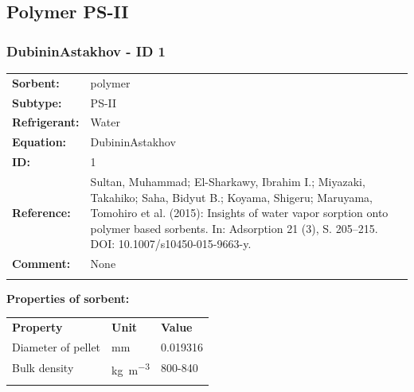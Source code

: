 \subsection{Polymer PS-II}
%
\subsubsection{DubininAstakhov - ID 1}
%
\begin{tabular}[l]{|lp{11.5cm}|}
\hline
\addlinespace

\textbf{Sorbent:} & polymer \\
\textbf{Subtype:} & PS-II \\
\textbf{Refrigerant:} & Water \\
\textbf{Equation:} & DubininAstakhov \\
\textbf{ID:} & 1 \\
\textbf{Reference:} & Sultan, Muhammad; El-Sharkawy, Ibrahim I.; Miyazaki, Takahiko; Saha, Bidyut B.; Koyama, Shigeru; Maruyama, Tomohiro et al. (2015): Insights of water vapor sorption onto polymer based sorbents. In: Adsorption 21 (3), S. 205–215. DOI: 10.1007/s10450-015-9663-y. \\
\textbf{Comment:} & None \\

\addlinespace
\hline
\end{tabular}
\newline

\textbf{Properties of sorbent:}
\newline
%
\begin{longtable}[l]{lll}
\toprule
\addlinespace
\textbf{Property} & \textbf{Unit} & \textbf{Value} \\
\addlinespace
\midrule
\endhead
\bottomrule
\endfoot
\bottomrule
\endlastfoot
\addlinespace

Diameter of pellet & \si{\milli\meter} & 0.019316\\
Bulk density & \si{\kilogram\per\cubic\meter} & 800-840\\

\addlinespace\end{longtable}

